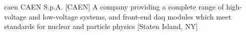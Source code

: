 \newglsXcompany%
{caen}%
{CAEN S.p.A.}%
[CAEN]%
{A company providing a complete range of \gls{high-voltage} and \gls{low-voltage} systems, and front-end \gls{daq} modules which meet  standards for nuclear and particle physics \cite{website:CAEN}}%
[Staten Island, NY]%